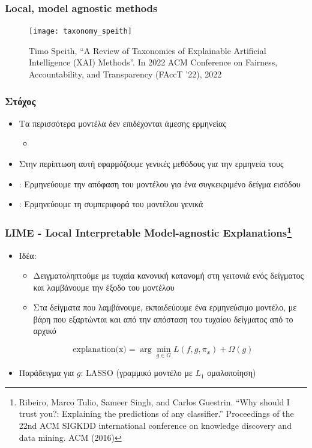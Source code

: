 \begin{frame}
  \frametitle{Local, model agnostic methods}
  \begin{figure}
    \texttt{[image: taxonomy\_speith]}
    \caption{\footnotesize Timo Speith, ``A Review of Taxonomies of Explainable
      Artificial Intelligence (XAI) Methods''. In 2022 ACM Conference on
      Fairness, Accountability, and Transparency (FAccT '22), 2022}
  \end{figure}
\end{frame}

\begin{frame}
  \frametitle{Στόχος}
  \begin{itemize}
  \item Τα περισσότερα μοντέλα δεν επιδέχονται άμεσης ερμηνείας
    \begin{itemize}
    \item {}
    \end{itemize}
  \item Στην περίπτωση αυτή εφαρμόζουμε γενικές μεθόδους για την ερμηνεία τους
  \item {}: Ερμηνεύουμε την απόφαση του μοντέλου για ένα συγκεκριμένο
    δείγμα εισόδου
  \item {}: Ερμηνεύουμε τη συμπεριφορά του μοντέλου γενικά
  \end{itemize}
\end{frame}

\begin{frame}
  \frametitle{LIME - Local Interpretable Model-agnostic
    Explanations\footnote{Ribeiro, Marco Tulio, Sameer Singh, and Carlos
    Guestrin. ``Why should I trust you?: Explaining the predictions of any
    classifier.'' Proceedings of the 22nd ACM SIGKDD international conference
    on knowledge discovery and data mining. ACM (2016)}} 
  \begin{itemize}
  \item Ιδέα:
    \begin{itemize}
    \item Δειγματοληπτούμε με τυχαία κανονική κατανομή στη γειτονιά ενός
      δείγματος και λαμβάνουμε την έξοδο του μοντέλου
    \item Στα δείγματα που λαμβάνουμε, εκπαιδεύουμε ένα ερμηνεύσιμο μοντέλο,
      με βάρη που εξαρτώνται και από την απόσταση του τυχαίου δείγματος από
      το αρχικό
    \end{itemize}
    \begin{equation*}
    \text{explanation(x)} = \arg\min\limits_{g\in G}L(f, g, \pi_x) + \Omega(g)
    \end{equation*}
  \item Παράδειγμα για $g$: LASSO (γραμμικό μοντέλο με $L_1$ ομαλοποίηση)
  \end{itemize}
\end{frame}

